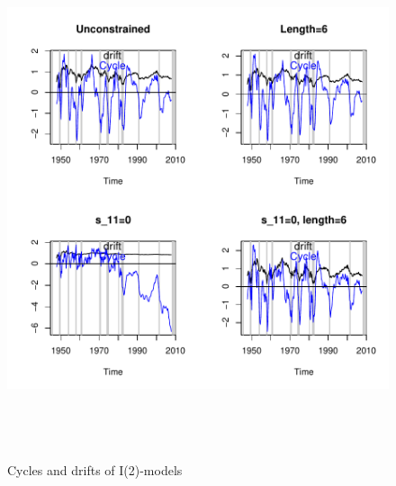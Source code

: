 \documentclass[a4paper]{book}
\begin{document}
\begin{enumerate}
\begin{figure}[H]\begin{center}\includegraphics[height=6in, width=6in]{z_us_real_log_gdp_comp_i2}\caption{Cycles and drifts of I(2)-models\label{z_us_real_log_gdp_comp_i2}}\end{center}\end{figure}\end{enumerate}  
\end{document}

